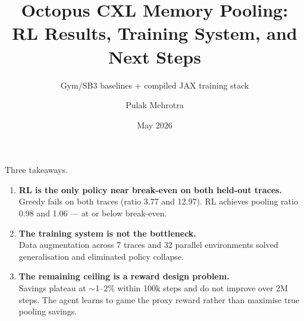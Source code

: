 \documentclass[11pt,aspectratio=43]{beamer}
\title{Octopus CXL Memory Pooling:\\RL Results, Training System, and Next Steps}
\subtitle{\small Gym/SB3 baselines + compiled JAX training stack}
\author{Pulak Mehrotra}
\date{May 2026}
\begin{document}
\begin{frame}[plain]
  \titlepage
\end{frame}


\begin{frame}{Three takeaways.}

  \vspace{0.4em}

  \begin{enumerate}
    \setlength{\itemsep}{1.5em}

    \item \textbf{RL is the only policy near break-even on both held-out traces.}\\[0.2em]
          Greedy fails on both traces (ratio 3.77 and 12.97).
          RL achieves pooling ratio 0.98 and 1.06 --- at or below break-even.

    \item \textbf{The training system is not the bottleneck.}\\[0.2em]
          Data augmentation across 7 traces and 32 parallel environments
          solved generalisation and eliminated policy collapse.

    \item \textbf{The remaining ceiling is a reward design problem.}\\[0.2em]
          Savings plateau at $\sim$1--2\% within 100k steps and do not
          improve over 2M steps.
          The agent learns to game the proxy reward rather than
          maximise true pooling savings.

  \end{enumerate}

\end{frame}

\end{document}
